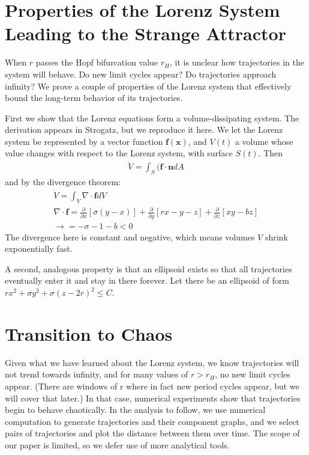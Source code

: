 \documentclass{report}
\begin{document}
\section{Properties of the Lorenz System Leading to the Strange Attractor}

When \(r\) passes the Hopf bifurcation value \(r_H\), it is unclear how
trajectories in the system will behave. Do new limit cycles appear? Do
trajectories approach infinity? We prove a couple of properties of the Lorenz
system that effectively bound the long-term behavior of its trajectories.

First we show that the Lorenz equations form a volume-dissipating system. The
derivation appears in Strogatz\cite{strogatz15}, but we reproduce it here.
We let the Lorenz system be represented by a vector function
\(\boldsymbol{f}(\boldsymbol{x})\), and \(V(t)\) a volume whose value changes
with respect to the Lorenz system, with surface \(S(t)\). Then
\begin{align*}
  \dot{V} = \int_S (\boldsymbol{f}\cdot\boldsymbol{n}dA
\end{align*}
and by the divergence theorem:
\begin{align*}
  \dot{V} = \int_V \nabla\cdot\boldsymbol{f}dV \\
  \nabla\cdot\boldsymbol{f} = \frac{\partial}{\partial x}[\sigma(y-x)]
+\frac{\partial}{\partial y}[rx-y-z] + \frac{\partial}{\partial z}[xy-bz] \\
  \rightarrow = -\sigma -1-b < 0 
\end{align*}
The divergence here is constant and negative, which means volumes \(V\) shrink
exponentially fast.

A second, analogous property is that an ellipsoid exists so that all
trajectories eventually enter it and stay in there forever. Let there be an
ellipsoid of form \(rx^2 +\sigma y^2+\sigma(z-2r)^2 \leq C\).

\section{Transition to Chaos}

Given what we have learned about the Lorenz system, we know trajectories will
not trend towards infinity, and for many values of \( r > r_H\), no new limit
cycles appear. (There are windows of r where in fact new period cycles appear,
but we will cover that later.) In that case, numerical experiments show that
trajectories begin to behave chaotically. In the analysis to follow, we use
numerical computation to generate trajectories and their component graphs, and
we select pairs of trajectories and plot the distance between them over time.
The scope of our paper is limited, so we defer use of more analytical tools.
\end{document}
